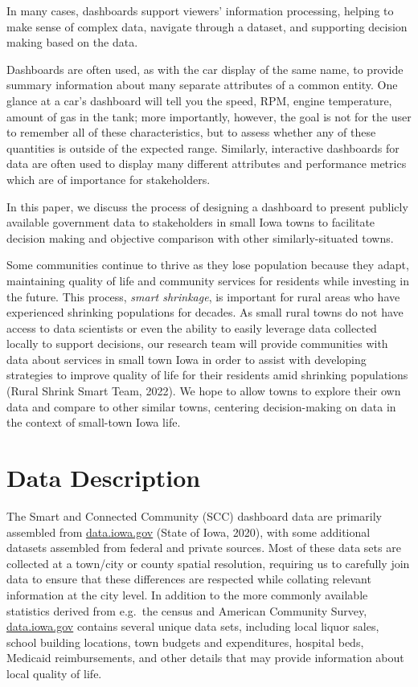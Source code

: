 \documentclass[print]{nuthesis}
\begin{document}
In many cases, dashboards support viewers' information processing, helping to make sense of complex data, navigate through a dataset, and supporting decision making based on the data.

Dashboards are often used, as with the car display of the same name, to provide summary information about many separate attributes of a common entity. One glance at a car's dashboard will tell you the speed, RPM, engine temperature, amount of gas in the tank; more importantly, however, the goal is not for the user to remember all of these characteristics, but to assess whether any of these quantities is outside of the expected range.
Similarly, interactive dashboards for data are often used to display many different attributes and performance metrics which are of importance for stakeholders.

In this paper, we discuss the process of designing a dashboard to present publicly available government data to stakeholders in small Iowa towns to facilitate decision making and objective comparison with other similarly-situated towns.

Some communities continue to thrive as they lose population because they adapt, maintaining quality of life and community services for residents while investing in the future. This process, \emph{smart shrinkage}, is important for rural areas who have experienced shrinking populations for decades. As small rural towns do not have access to data scientists or even the ability to easily leverage data collected locally to support decisions, our research team will provide communities with data about services in small town Iowa in order to assist with developing strategies to improve quality of life for their residents amid shrinking populations (Rural Shrink Smart Team, 2022). We hope to allow towns to explore their own data and compare to other similar towns, centering decision-making on data in the context of small-town Iowa life.

\hypertarget{data-description}{%
\section{Data Description}\label{data-description}}

The Smart and Connected Community (SCC) dashboard data are primarily assembled from \url{data.iowa.gov} (State of Iowa, 2020), with some additional datasets assembled from federal and private sources. Most of these data sets are collected at a town/city or county spatial resolution, requiring us to carefully join data to ensure that these differences are respected while collating relevant information at the city level. In addition to the more commonly available statistics derived from e.g.~the census and American Community Survey, \url{data.iowa.gov} contains several unique data sets, including local liquor sales, school building locations, town budgets and expenditures, hospital beds, Medicaid reimbursements, and other details that may provide information about local quality of life.
\end{document}
